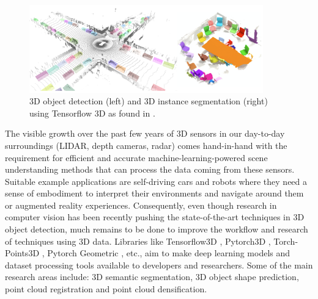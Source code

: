 \begin{figure}[!ht]
        \centering
        \includegraphics[width=0.9\textwidth]{images/sceneU01.png}
        \caption{3D object detection (left) and 3D instance segmentation (right) using Tensorflow 3D as found in \cite{najibi2020dops}.
        }
        \label{fig:sceneU01}
\end{figure}


The visible growth over the past few years of 3D sensors in our day-to-day surroundings (LIDAR, depth cameras, radar) comes hand-in-hand with the requirement for efficient and accurate machine-learning-powered scene understanding methods that can process the data coming from these sensors. Suitable example applications are self-driving cars and robots where they need a sense of embodiment to interpret their environments and navigate around them or augmented reality experiences. Consequently, even though research in computer vision has been recently pushing the state-of-the-art techniques in 3D object detection, much remains to be done to improve the workflow and research of techniques using 3D data. Libraries like Tensorflow3D \cite{najibi2020dops}, Pytorch3D \cite{ravi2020pytorch3d}, Torch-Points3D \cite{tp3d}, Pytorch Geometric \cite{Fey/Lenssen/2019}, etc., aim to make deep learning models and dataset processing tools available to developers and researchers. Some of the main research areas include: 3D semantic segmentation, 3D object shape prediction, point cloud registration and point cloud densification.





